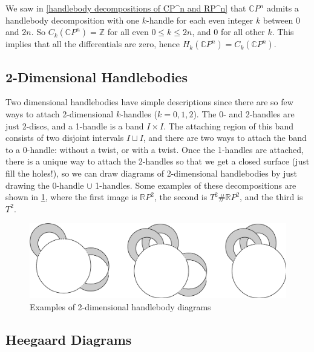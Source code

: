 \begin{example}
We saw in \cref{handlebody decompositions of CP^n and RP^n} that $\mathbb CP^n$ admits a handlebody decomposition with one $k$-handle for each even integer $k$ between $0$ and $2n$. So $C_{k}(\mathbb CP^n)=\mathbb Z$ for all even $0 \leq k \leq 2n$, and 0 for all other $k$. This implies that all the differentials are zero, hence $H_k(\mathbb CP^n) = C_k(\mathbb CP^n)$.
\end{example}




\subsection{2-Dimensional Handlebodies}
\label{2-Dimensional Handlebodies}



Two dimensional handlebodies have simple descriptions since there are so few ways to attach 2-dimensional $k$-handles ($k=0,1,2$). The 0- and 2-handles are just 2-discs, and a 1-handle is a band $I \times I$. The attaching region of this band consists of two disjoint intervals $I \sqcup I$, and there are two ways to attach the band to a 0-handle: without a twist, or with a twist. Once the 1-handles are attached, there is a unique way to attach the 2-handles so that we get a closed surface (just fill the holes!), so we can draw diagrams of 2-dimensional handlebodies by just drawing the 0-handle $\cup$ 1-handles. Some examples of these decompositions are shown in \cref{2-dimensional handlebody diagrams}, where the first image is $\mathbb RP^2$, the second is $T^2 \# \mathbb RP^2$, and the third is $T^2$. 

\begin{figure}[tb]
\centering
\includegraphics[scale=.6]{graphics/2-dim-handlebody-diagram}
\caption{Examples of 2-dimensional handlebody diagrams}
\label{2-dimensional handlebody diagrams}
\end{figure}





\subsection{Heegaard Diagrams}
\label{Heegaard Diagrams}


